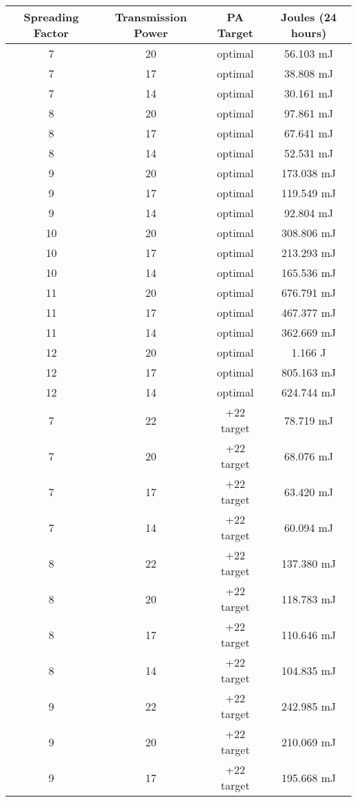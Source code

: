  \begin{table*}[ht!]
    \centering
    \small
    \begin{tabularx}{\columnwidth}{c c c c}
    \toprule
    Spreading Factor & Transmission Power & PA Target & Joules (24 hours) \\
    \midrule
    7 & 20 & optimal & 56.103 mJ \\
    7 & 17 & optimal & 38.808 mJ \\
    7 & 14 & optimal & 30.161 mJ \\
    \midrule
    8 & 20 & optimal & 97.861 mJ \\
    8 & 17 & optimal & 67.641 mJ \\
    8 & 14 & optimal & 52.531 mJ \\
    \midrule
    9 & 20 & optimal & 173.038 mJ \\
    9 & 17 & optimal & 119.549 mJ \\
    9 & 14 & optimal & 92.804 mJ \\
    \midrule
    10 & 20 & optimal & 308.806 mJ \\
    10 & 17 & optimal & 213.293 mJ \\
    10 & 14 & optimal & 165.536 mJ \\
    \midrule
    11 & 20 & optimal & 676.791 mJ \\
    11 & 17 & optimal & 467.377 mJ \\
    11 & 14 & optimal & 362.669 mJ \\
    \midrule
    12 & 20 & optimal & 1.166 J \\
    12 & 17 & optimal & 805.163 mJ \\
    12 & 14 & optimal & 624.744 mJ \\
    \midrule
    7 & 22 & +22 target & 78.719 mJ \\
    7 & 20 & +22 target & 68.076 mJ \\
    7 & 17 & +22 target & 63.420 mJ \\
    7 & 14 & +22 target & 60.094 mJ \\
    \midrule
    8 & 22 & +22 target & 137.380 mJ \\
    8 & 20 & +22 target & 118.783 mJ \\
    8 & 17 & +22 target & 110.646 mJ \\
    8 & 14 & +22 target & 104.835 mJ \\
    \midrule
    9 & 22 & +22 target & 242.985 mJ \\
    9 & 20 & +22 target & 210.069 mJ \\
    9 & 17 & +22 target & 195.668 mJ \\

\end{tabularx}
\end{table*}
